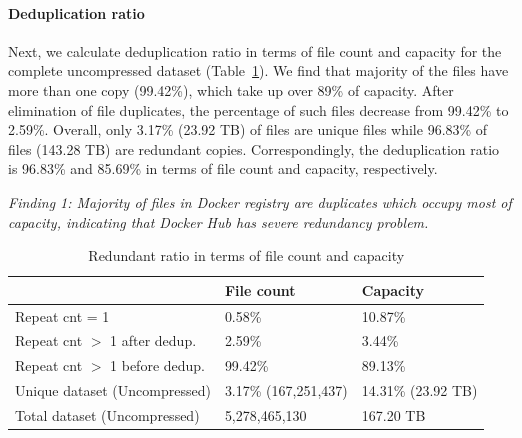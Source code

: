 \paragraph{Deduplication ratio}
Next, we calculate deduplication ratio in terms of file count and capacity for
the complete uncompressed dataset (Table~\ref{tbl:overall-redundant_ratio}).
We find that majority of the files have more than one copy (99.42\%), which
take up over 89\% of capacity.
After elimination of file duplicates, the
percentage of such files decrease from 99.42\% to 2.59\%. 
Overall, only 3.17\% (23.92 TB) of files are unique files while 96.83\% of files 
(143.28 TB) are redundant copies. Correspondingly, the deduplication ratio is 96.83\%
and 85.69\% in terms of file count and capacity, respectively.

\textit{Finding 1: Majority of files in Docker registry are
duplicates which occupy most of capacity, indicating that Docker Hub has severe
redundancy problem.}


\begin{table} 
	\centering 
	\scriptsize  
	\caption{Redundant ratio in terms of file count and capacity} \label{tbl:overall-redundant_ratio} 
	\begin{tabular}{|l|l|l|}%
		\hline  
		       & File count & Capacity \\
		\hline
		Repeat cnt = 1 & 0.58\% & 10.87\%\\
		\hline
		Repeat cnt $>$ 1 after dedup. & 2.59\% & 3.44\%\\
		\hline
		Repeat cnt $>$ 1 before dedup.  & 99.42\%  & 89.13\%\\
		\hline
		Unique dataset (Uncompressed) & 3.17\% (167,251,437)  &  14.31\% (23.92 TB) \\
		\hline 
		Total dataset (Uncompressed) & 5,278,465,130 & 167.20 TB \\
		\hline 	
	\end{tabular} 
\end{table} 

